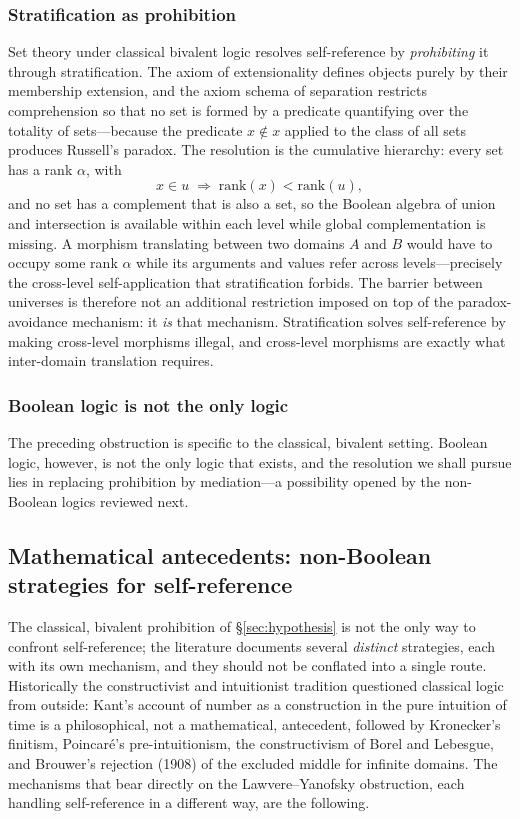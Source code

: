 \subsubsection{Stratification as prohibition}
Set theory under classical bivalent logic resolves self-reference by \emph{prohibiting} it through stratification.
The axiom of extensionality defines objects purely by their membership extension, and the axiom schema of
separation restricts comprehension so that no set is formed by a predicate quantifying over the totality of
sets---because the predicate $x\notin x$ applied to the class of all sets produces Russell's paradox. The
resolution is the cumulative hierarchy: every set has a rank $\alpha$, with
\begin{equation}
x\in u \;\Longrightarrow\; \mathrm{rank}(x)<\mathrm{rank}(u),
\end{equation}
and no set has a complement that is also a set, so the Boolean algebra of union and intersection is available
within each level while global complementation is missing. A morphism translating between two domains $A$ and $B$
would have to occupy some rank $\alpha$ while its arguments and values refer across levels---precisely the
cross-level self-application that stratification forbids. The barrier between universes is therefore not an
additional restriction imposed on top of the paradox-avoidance mechanism: it \emph{is} that mechanism.
Stratification solves self-reference by making cross-level morphisms illegal, and cross-level morphisms are exactly
what inter-domain translation requires.

\subsubsection{Boolean logic is not the only logic}
The preceding obstruction is specific to the classical, bivalent setting. Boolean logic, however, is not the only
logic that exists, and the resolution we shall pursue lies in replacing prohibition by mediation---a possibility
opened by the non-Boolean logics reviewed next.

\subsection{Mathematical antecedents: non-Boolean strategies for self-reference}\label{sec:math}

The classical, bivalent prohibition of \S\ref{sec:hypothesis} is not the only way to confront self-reference; the
literature documents several \emph{distinct} strategies, each with its own mechanism, and they should not be
conflated into a single route. Historically the constructivist and intuitionist tradition questioned classical
logic from outside: Kant's account of number as a construction in the pure intuition of time is a philosophical,
not a mathematical, antecedent, followed by Kronecker's finitism, Poincar\'e's pre-intuitionism, the constructivism
of Borel and Lebesgue, and Brouwer's rejection (1908) of the excluded middle for infinite domains. The mechanisms
that bear directly on the Lawvere--Yanofsky obstruction, each handling self-reference in a different way, are the
following.

